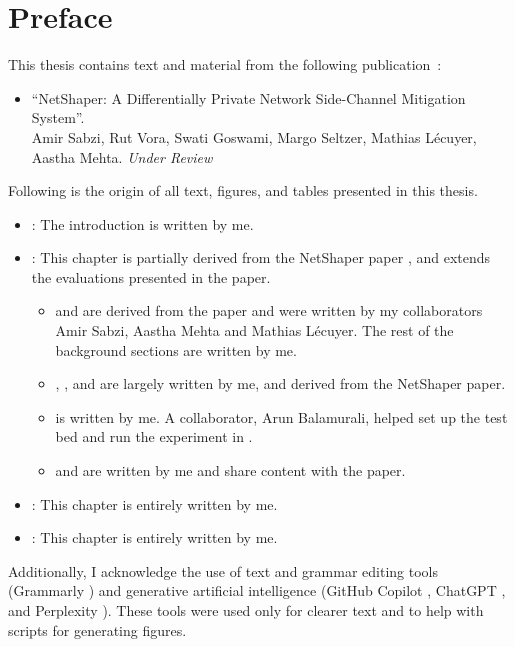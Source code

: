 
\chapter{Preface}


This thesis contains text and material from the following publication~\cite{sabzi2024netshaper}:
\begin{itemize}
  \item ``NetShaper: A Differentially Private Network Side-Channel Mitigation System''.
  \\
  Amir Sabzi, Rut Vora, Swati Goswami, Margo Seltzer, Mathias Lécuyer, Aastha Mehta. \textit{Under Review}
\end{itemize}

Following is the origin of all text, figures, and tables presented in this thesis.

\begin{itemize}
  \item \textbf{}: The introduction is written by me. 
  
  \item \textbf{}: This chapter is partially derived from the NetShaper paper \cite{sabzi2024netshaper}, and extends the evaluations presented in the paper.
  \begin{itemize}
      \item {} and  are derived from the paper and were written by my collaborators Amir Sabzi, Aastha Mehta and Mathias L\'{e}cuyer. The rest of the background sections are written by me.
      \item {}, , and  are largely written by me, and derived from the NetShaper paper.
      \item {} is written by me. A collaborator, Arun Balamurali, helped set up the test bed and run the experiment in .
      \item {} and  are written by me and share content with the paper.
  \end{itemize}
  
  \item \textbf{}: This chapter is entirely written by me.
  
  \item \textbf{}: This chapter is entirely written by me.

\end{itemize}


Additionally, I acknowledge the use of text and grammar editing tools (Grammarly \cite{grammarly}) and generative artificial intelligence (GitHub Copilot \cite{github_copilot}, ChatGPT \cite{chatgpt}, and Perplexity \cite{perplexity}). 
These tools were used only for clearer text and to help with scripts for generating figures.